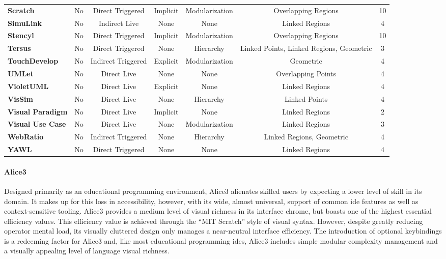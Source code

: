 \begin{table*}
{\begin{tabular}{l|ccc|ccc}
      \textbf{Scratch}    & No	& Direct Triggered	& Implicit	& Modularization	& Overlapping Regions	& 10			\\[1ex]
      \textbf{SimuLink}    & No	& Indirect Live	& None	& None	& Linked Regions	& 4			\\[1ex]
      \textbf{Stencyl}    & No	& Direct Triggered	& Implicit	& Modularization	& Overlapping Regions	& 10			\\[1ex]
      \textbf{Tersus}    & No	& Direct Triggered	& None	& Hierarchy	& Linked Points, Linked Regions, Geometric	& 3			\\[1ex]
      \textbf{TouchDevelop}    & No	& Indirect Triggered	& Explicit	& Modularization	& Geometric	& 4			\\[1ex]
      \textbf{UMLet}    & No	& Direct Live	& None	& None	& Overlapping Points	& 4			\\[1ex]
      \textbf{VioletUML}    & No	& Direct Live	& Explicit	& None	& Linked Regions	& 4			\\[1ex]
      \textbf{VisSim}    & No	& Direct Live	& None	& Hierarchy	& Linked Points	& 4			\\[1ex]
      \textbf{Visual Paradigm}    & No	& Direct Live	& Implicit	& None	& Linked Regions	& 2			\\[1ex]
      \textbf{Visual Use Case}    & No	& Direct Live	& None	& Modularization	& Linked Regions	& 3			\\[1ex]
      \textbf{WebRatio}    & No	& Indirect Triggered	& None	& Hierarchy	& Linked Regions, Geometric	& 4			\\[1ex]
      \textbf{YAWL}    & No	& Direct Triggered	& None	& None	& Linked Regions	& 4			\\[1ex]
		\end{tabular}}
	\caption{Measure of the integration and language syntax of \acp{ide}.}
	\label{tab:integration-langsyn}
\end{table*}
%
\paragraph{Alice3} Designed primarily as an educational programming
environment, Alice3 alienates skilled users by expecting a lower level of
skill in its domain. It makes up for this loss in accessibility, however,
with its wide, almost universal, support of common \ac{ide} features as
well as context-sensitive tooling. Alice3 provides a medium level of visual
richness in its interface chrome, but boasts one of the highest essential
efficiency values. This efficiency value is achieved through the ``MIT
Scratch'' style of visual syntax. However, despite greatly reducing
operator mental load, its visually cluttered design only manages a
near-neutral interface efficiency. The introduction of optional keybindings
is a redeeming factor for Alice3 and, like most educational programming
\acp{ide}, Alice3 includes simple modular complexity management and a
visually appealing level of language visual richness.

